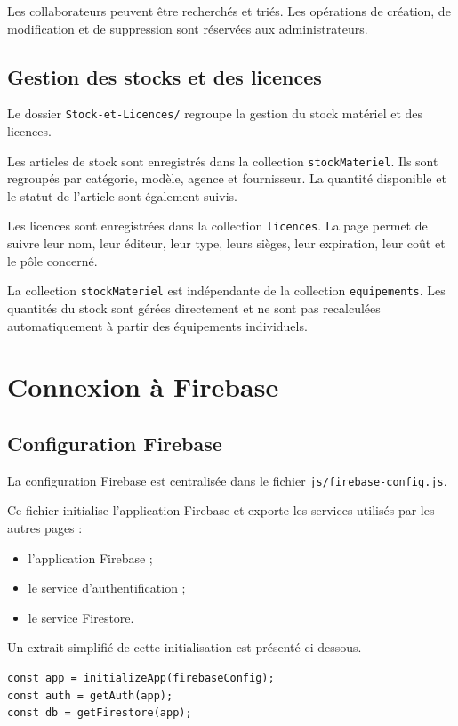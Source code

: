 \documentclass{rapportENSIAS}
\begin{document}
Les collaborateurs peuvent être recherchés et triés. Les opérations de création, de modification et de suppression sont réservées aux administrateurs.

\subsection{Gestion des stocks et des licences}

Le dossier \texttt{Stock-et-Licences/} regroupe la gestion du stock matériel et des licences.

Les articles de stock sont enregistrés dans la collection \texttt{stockMateriel}. Ils sont regroupés par catégorie, modèle, agence et fournisseur. La quantité disponible et le statut de l’article sont également suivis.

Les licences sont enregistrées dans la collection \texttt{licences}. La page permet de suivre leur nom, leur éditeur, leur type, leurs sièges, leur expiration, leur coût et le pôle concerné.

La collection \texttt{stockMateriel} est indépendante de la collection \texttt{equipements}. Les quantités du stock sont gérées directement et ne sont pas recalculées automatiquement à partir des équipements individuels.

\section{Connexion à Firebase}

\subsection{Configuration Firebase}

La configuration Firebase est centralisée dans le fichier \texttt{js/firebase-config.js}.

Ce fichier initialise l’application Firebase et exporte les services utilisés par les autres pages :

\begin{itemize}
    \item l’application Firebase ;
    \item le service d’authentification ;
    \item le service Firestore.
\end{itemize}

Un extrait simplifié de cette initialisation est présenté ci-dessous.

\begin{verbatim}
const app = initializeApp(firebaseConfig);
const auth = getAuth(app);
const db = getFirestore(app);
\end{verbatim}
\end{document}
